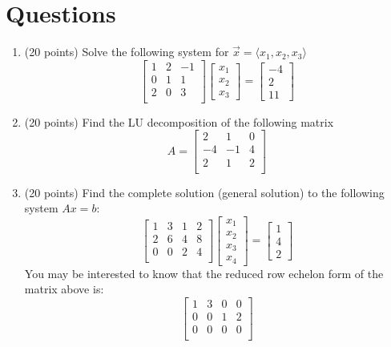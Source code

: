 \documentclass[12pt, a4paper]{article}
\theoremstyle{break}
\begin{document}
\section{Questions}
\begin{enumerate}
\item (20  points) Solve the following system for $\vec{x}=\langle x_1,x_2,x_3 \rangle$
\begin{equation}
\begin{bmatrix}
1&2&-1 \\
0&1&1 \\
2&0&3 \\
\end{bmatrix}
\begin{bmatrix}
x_1\\
x_2 \\
x_3 
\end{bmatrix}=
\begin{bmatrix}
-4\\
2\\
11
\end{bmatrix} \nonumber
\end{equation} 
\newpage
\item (20 points) Find the LU decomposition of the following matrix
\begin{equation}
A=
\begin{bmatrix}
2 & 1 & 0 \\
-4 & -1 & 4 \\
2 & 1 & 2 \\
\end{bmatrix}
\end{equation}

\newpage
\item (20 points)  Find the complete solution (general solution) to the following system $Ax=b$:
\begin{equation}
\begin{bmatrix}
1 & 3 & 1 &2  \\
2&6 &4 & 8 \\
0&0&2&4 \\
\end{bmatrix}
\begin{bmatrix}
x_1\\
x_2 \\
x_3 \\
x_4 
\end{bmatrix}=
\begin{bmatrix}
1 \\
4 \\
2 
\end{bmatrix} \nonumber
\end{equation}
You may be interested to know that the reduced row echelon form of the matrix above is:
$$
\begin{bmatrix}
1 & 3 & 0 &0  \\
0&0 &1 & 2 \\
0&0&0&0 \\
\end{bmatrix} \nonumber
$$
\newpage


\end{enumerate}
\end{document}

